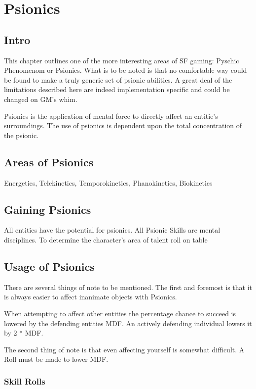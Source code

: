 \chapter{Psionics}

\section{Intro}

This chapter outlines one of the more interesting areas of SF gaming: 
Pyschic Phenomenom or Psionics. What is to be noted is that no 
comfortable way could be found to make a truly generic set of psionic 
abilities. A great deal of the limitations described here are indeed 
implementation specific and could be changed on GM's whim.

Psionics is the application of mental force to directly affect an entitie's
surroundings. The use of psionics is dependent upon the total concentration
of the psionic. 


\section{Areas of Psionics}

Energetics, Telekinetics, Temporokinetics, Phanokinetics, Biokinetics

\section{Gaining Psionics}

All entities have the potential for psionics. 
All Psionic Skills are mental disciplines.
To determine the character's area of talent roll on table

\section{Usage of Psionics}

There are several things of note to be mentioned. The first and foremost
is that it is always easier to affect inanimate objects with Psionics.

When attempting to affect other entities the percentage chance to succeed
is lowered by the defending entities MDF. An actively defending individual
lowers it by 2 * MDF.

The second thing of note is that even affecting yourself is somewhat
difficult. A Roll must be made to lower MDF.

\subsection{Skill Rolls}

